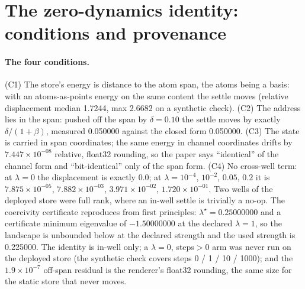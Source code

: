 \documentclass{article} %
\newcommand{\sci}[2]{\ensuremath{#1\times10^{#2}}}
\begin{document}
\section{The zero-dynamics identity: conditions and provenance}
\label{app:clue}

\paragraph{The four conditions.} (C1) The store's energy is distance to the atom span, the atoms
being a basis: with an atoms-as-points energy on the same content the settle moves (relative
displacement median 1.7244, max 2.6682 on a synthetic check). (C2) The address lies in the span:
pushed off the span by $\delta=0.10$ the settle moves by exactly $\delta/(1+\beta)$, measured
0.050000 against the closed form 0.050000. (C3) The state is carried in span coordinates; the same
energy in channel coordinates drifts by \sci{7.447}{-08} relative, float32 rounding, so the paper
says ``identical'' of the channel form and ``bit-identical'' only of the span form. (C4) No
cross-well term: at $\lambda=0$ the displacement is exactly 0.0; at
$\lambda=10^{-4}$, $10^{-2}$, $0.05$, $0.2$ it is \sci{7.875}{-05}, \sci{7.882}{-03},
\sci{3.971}{-02}, \sci{1.720}{-01}. Two wells of the deployed store were full rank, where an in-well
settle is trivially a no-op. The coercivity certificate reproduces from first principles:
$\lambda^\star=0.25000000$ and a certificate minimum eigenvalue of $-1.50000000$ at the declared
$\lambda=1$, so the landscape is unbounded below at the declared strength and the used strength is
0.225000. %
The identity is in-well only; a $\lambda=0$, steps$>0$ arm was never run on the deployed store (the
synthetic check covers steps 0 / 1 / 10 / 1000); and the \sci{1.9}{-7} off-span residual is the
renderer's float32 rounding, the same size for the static store that never moves.
\end{document}
